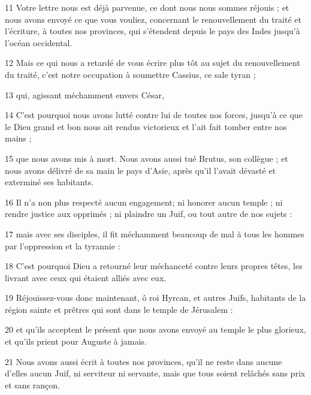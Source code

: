 \par 11 Votre lettre nous est déjà parvenue, ce dont nous nous sommes réjouis ; et nous avons envoyé ce que vous vouliez, concernant le renouvellement du traité et l'écriture, à toutes nos provinces, qui s'étendent depuis le pays des Indes jusqu'à l'océan occidental.

\par 12 Mais ce qui nous a retardé de vous écrire plus tôt au sujet du renouvellement du traité, c'est notre occupation à soumettre Cassius, ce sale tyran ;

\par 13 qui, agissant méchamment envers César,

\par 14 C'est pourquoi nous avons lutté contre lui de toutes nos forces, jusqu'à ce que le Dieu grand et bon nous ait rendus victorieux et l'ait fait tomber entre nos mains ;

\par 15 que nous avons mis à mort. Nous avons aussi tué Brutus, son collègue ; et nous avons délivré de sa main le pays d'Asie, après qu'il l'avait dévasté et exterminé ses habitants.

\par 16 Il n'a non plus respecté aucun engagement; ni honorer aucun temple ; ni rendre justice aux opprimés ; ni plaindre un Juif, ou tout autre de nos sujets :

\par 17 mais avec ses disciples, il fit méchamment beaucoup de mal à tous les hommes par l'oppression et la tyrannie :

\par 18 C'est pourquoi Dieu a retourné leur méchanceté contre leurs propres têtes, les livrant avec ceux qui étaient alliés avec eux.

\par 19 Réjouissez-vous donc maintenant, ô roi Hyrcan, et autres Juifs, habitants de la région sainte et prêtres qui sont dans le temple de Jérusalem :

\par 20 et qu'ils acceptent le présent que nous avons envoyé au temple le plus glorieux, et qu'ils prient pour Auguste à jamais.

\par 21 Nous avons aussi écrit à toutes nos provinces, qu'il ne reste dans aucune d'elles aucun Juif, ni serviteur ni servante, mais que tous soient relâchés sans prix et sans rançon.

